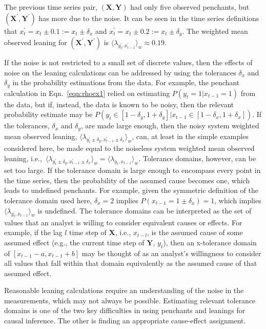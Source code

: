 \documentclass{article}[10pt]
\begin{document}
The previous time series pair, $(\mathbf{X},\mathbf{Y})$ had only five observed penchants, but $(\mathbf{X}^\prime,\mathbf{Y}^\prime)$ has more due to the noise.  It can be seen in the time series definitions that $x_t^\prime = x_t \pm 0.1 := x_t \pm \delta_x$ and $x_t^\prime = x_t \pm 0.2 := x_t \pm \delta_y$.  The weighted mean observed leaning for $(\mathbf{X}^\prime,\mathbf{Y}^\prime)$ is $\langle \lambda_{y_t^\prime,x_{t-1}^\prime} \rangle_w \approx 0.19$. 

If the noise is not restricted to a small set of discrete values, then the effects of noise on the leaning calculations can be addressed by using the tolerances $\delta_x$ and $\delta_y$ in the probability estimations from the data.  For example, the penchant calculation in Eqn.\ \ref{eqn:rhoex1} relied on estimating $P(y_t=1|x_{t-1}=1)$ from the data, but if, instead, the data is known to be noisy, then the relevant probability estimate may be $P(y_t\in[1-\delta_y,1+\delta_y]|x_{t-1}\in[1-\delta_x,1+\delta_x])$.  If the tolerances, $\delta_x$ and $\delta_y$, are made large enough, then the noisy system weighted mean observed leaning, $\langle \lambda_{y_t^\prime\pm\delta_y,x_{t-1}^\prime\pm\delta_x} \rangle_w$, can, at least in the simple examples considered here, be made equal to the noiseless system weighted mean observed leaning, i.e.,\ $\langle \lambda_{y_t^\prime\pm\delta_y,x_{t-1}^\prime\pm\delta_x} \rangle_w = \langle \lambda_{y_t,x_{t-1}} \rangle_w$.  Tolerance domains, however, can be set too large.  If the tolerance domain is large enough to encompass every point in the time series, then the probability of the assumed cause becomes one, which leads to undefined penchants.  For example, given the symmetric definition of the tolerance domain used here, $\delta_x = 2$ implies $P(x_{t-1} = 1\pm\delta_x) = 1$, which implies $\langle \lambda_{y_t^\prime,x_{t-1}} \rangle_w$ is undefined.  The tolerance domains can be interpreted as the set of values that an analyst is willing to consider equivalent causes or effects.  For example, if the lag $l$ time step of $\mathbf{X}$, i.e., $x_{t-l}$, is the assumed cause of some assumed effect (e.g., the current time step of $\mathbf{Y}$, $y_t$), then an x-tolerance domain of $[x_{t-1}-a,x_{t-1}+b]$ may be thought of as an analyst's willingness to consider all values that fall within that domain equivalently as the assumed cause of that assumed effect.

Reasonable leaning calculations require an understanding of the noise in the measurements, which may not always be possible.  Estimating relevant tolerance domains is one of the two key difficulties in using penchants and leanings for causal inference.  The other is finding an appropriate cause-effect assignment.
\end{document}
